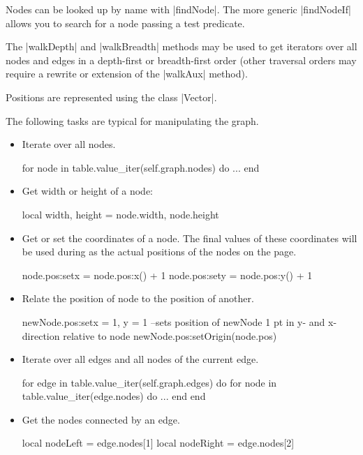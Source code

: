 Nodes can be looked up by name with |findNode|. The more generic
|findNodeIf| allows you to search for a node passing a test
predicate. 

The |walkDepth| and |walkBreadth| methods may be used to get
iterators over all nodes and edges in a depth-first or breadth-first
order (other traversal orders may require a rewrite or extension of the
|walkAux| method).

Positions are represented using the class |Vector|.

The following tasks are typical for manipulating the graph.

\begin{itemize}
\item Iterate over all nodes.
\begin{codeexample}
for node in table.value_iter(self.graph.nodes) do
   ...
end
\end{codeexample}
\item Get width or height of a node:
\begin{codeexample}
local width, height = node.width, node.height
\end{codeexample}
\item Get or set the coordinates of a node. The final values of these
  coordinates will be used during as the actual positions of the nodes
  on the page.
\begin{codeexample}
node.pos:set{x = node.pos:x() + 1}
node.pos:set{y = node.pos:y() + 1}
\end{codeexample}
\item Relate the position of node to the position of another.
\begin{codeexample}
newNode.pos:set{x = 1, y = 1}
--sets position of newNode 1 pt in y- and x-direction relative to node
newNode.pos:setOrigin(node.pos)
\end{codeexample}
\item Iterate over all edges and all nodes of the current edge.
\begin{codeexample}
for edge in table.value_iter(self.graph.edges) do
   for node in table.value_iter(edge.nodes) do
      ...
   end
end
\end{codeexample}
\item Get the nodes connected by an edge.
\begin{codeexample}
local nodeLeft = edge.nodes[1]
local nodeRight = edge.nodes[2]
\end{codeexample}
\end{itemize}

